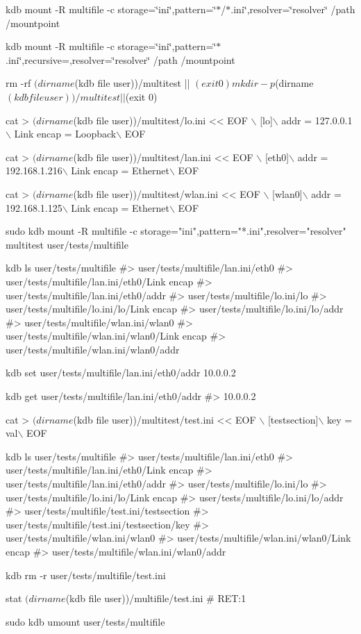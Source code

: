 {\ttfamily kdb mount -\/R multifile -\/c storage=\char`\"{}ini\char`\"{},pattern=\char`\"{}$\ast$/$\ast$.\+ini\char`\"{},resolver=\char`\"{}resolver\char`\"{} /path /mountpoint}

{\ttfamily kdb mount -\/R multifile -\/c storage=\char`\"{}ini\char`\"{},pattern=\char`\"{}$\ast$.\+ini\char`\"{},recursive=,resolver=\char`\"{}resolver\char`\"{} /path /mountpoint}


\begin{DoxyCode}
rm -rf $(dirname $(kdb file user))/multitest || $(exit 0)
mkdir -p $(dirname $(kdb file user))/multitest || $(exit 0)

cat > $(dirname $(kdb file user))/multitest/lo.ini << EOF \(\backslash\)
[lo]\(\backslash\)
addr = 127.0.0.1\(\backslash\)
Link encap = Loopback\(\backslash\)
EOF

cat > $(dirname $(kdb file user))/multitest/lan.ini << EOF \(\backslash\)
[eth0]\(\backslash\)
addr = 192.168.1.216\(\backslash\)
Link encap = Ethernet\(\backslash\)
EOF

cat > $(dirname $(kdb file user))/multitest/wlan.ini << EOF \(\backslash\)
[wlan0]\(\backslash\)
addr = 192.168.1.125\(\backslash\)
Link encap = Ethernet\(\backslash\)
EOF

sudo kdb mount -R multifile -c storage="ini",pattern="*.ini",resolver="resolver" multitest
       user/tests/multifile

kdb ls user/tests/multifile
#> user/tests/multifile/lan.ini/eth0
#> user/tests/multifile/lan.ini/eth0/Link encap
#> user/tests/multifile/lan.ini/eth0/addr
#> user/tests/multifile/lo.ini/lo
#> user/tests/multifile/lo.ini/lo/Link encap
#> user/tests/multifile/lo.ini/lo/addr
#> user/tests/multifile/wlan.ini/wlan0
#> user/tests/multifile/wlan.ini/wlan0/Link encap
#> user/tests/multifile/wlan.ini/wlan0/addr

kdb set user/tests/multifile/lan.ini/eth0/addr 10.0.0.2

kdb get user/tests/multifile/lan.ini/eth0/addr
#> 10.0.0.2

cat > $(dirname $(kdb file user))/multitest/test.ini << EOF \(\backslash\)
[testsection]\(\backslash\)
key = val\(\backslash\)
EOF

kdb ls user/tests/multifile
#> user/tests/multifile/lan.ini/eth0
#> user/tests/multifile/lan.ini/eth0/Link encap
#> user/tests/multifile/lan.ini/eth0/addr
#> user/tests/multifile/lo.ini/lo
#> user/tests/multifile/lo.ini/lo/Link encap
#> user/tests/multifile/lo.ini/lo/addr
#> user/tests/multifile/test.ini/testsection
#> user/tests/multifile/test.ini/testsection/key
#> user/tests/multifile/wlan.ini/wlan0
#> user/tests/multifile/wlan.ini/wlan0/Link encap
#> user/tests/multifile/wlan.ini/wlan0/addr

kdb rm -r user/tests/multifile/test.ini

stat $(dirname $(kdb file user))/multifile/test.ini
# RET:1

sudo kdb umount user/tests/multifile
\end{DoxyCode}


